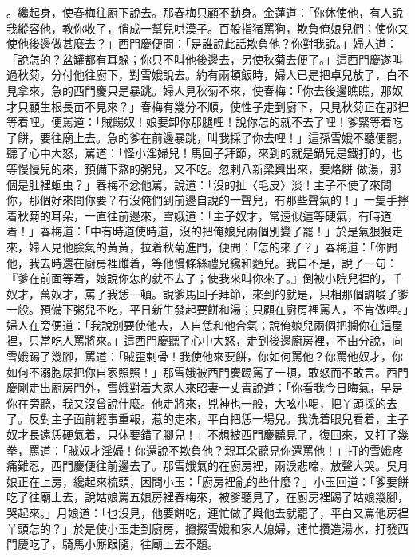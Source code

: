 \begin{showcontents}{}
。纔起身，使春梅往廚下說去。那春梅只顧不動身。金蓮道：「你休使他，有人說我縱容他，教你收了，俏成一幫兒哄漢子。百般指猪罵狗，欺負俺娘兒們；使你又使他後邊做甚麼去？」西門慶便問：「是誰說此話欺負他？你對我說。」婦人道：「說怎的？盆罐都有耳躲；你只不叫他後邊去，另使秋菊去便了。」這西門慶遂叫過秋菊，分付他往廚下，對雪娥說去。約有兩頓飯時，婦人已是把卓兒放了，白不見拿來，急的西門慶只是暴跳。婦人見秋菊不來，使春梅：「你去後邊瞧瞧，那奴才只顧生根長苗不見來？」春梅有幾分不順，使性子走到廚下，只見秋菊正在那裡等着哩。便罵道：「賊餳奴！娘要卸你那腿哩！說你怎的就不去了哩！爹緊等着吃了餅，要往廟上去。急的爹在前邊暴跳，叫我採了你去哩！」這孫雪娥不聽便罷，聽了心中大怒，罵道：「怪小淫婦兒！馬回子拜節，來到的就是鍋兒是鐵打的，也等慢慢兒的來，預備下熬的粥兒，又不吃。忽剌八新梁興出來，要烙餅 做湯，那個是肚裡蛔虫？」春梅不忿他罵，說道：「沒的扯〈毛皮〉淡！主子不使了來問你，那個好來問你要？有沒俺們到前邊自說的一聲兒，有那些聲氣的！」一隻手擰着秋菊的耳朵，一直往前邊來，雪娥道：「主子奴才，常遠似這等硬氣，有時道着！」春梅道：「中有時道使時道，沒的把俺娘兒兩個別變了罷！」於是氣狠狠走來，婦人見他臉氣的黃黃，拉着秋菊進門，便問：「怎的來了？」春梅道：「你問他，我去時還在廚房裡雌着，等他慢條絲禮兒纔和麪兒。我自不是，說了一句：『爹在前面等着，娘說你怎的就不去了；使我來叫你來了。』倒被小院兒裡的，千奴才，萬奴才，罵了我恁一頓。說爹馬回子拜節，來到的就是，只相那個調唆了爹一般。預備下粥兒不吃，平日新生發起要餅和湯；只顧在廚房裡罵人，不肯做哩。」婦人在旁便道：「我說別要使他去，人自恁和他合氣；說俺娘兒兩個把攔你在這屋裡，只當吃人罵將來。」這西門慶聽了心中大怒，走到後邊廚房裡，不由分說，向雪娥踢了幾腳，罵道：「賊歪剌骨！我使他來要餅，你如何罵他？你罵他奴才，你如何不溺胞尿把你自家照照！」那雪娥被西門慶踢罵了一頓，敢怒而不敢言。西門慶剛走出廚房門外，雪娥對着大家人來昭妻一丈青說道：「你看我今日晦氣，早是你在旁聽，我又沒曾說什麼。他走將來，兇神也一般，大吆小喝，把丫頭採的去了。反對主子面前輕事重報，惹的走來，平白把恁一場兒。我洗着眼兒看着，主子奴才長遠恁硬氣着，只休要錯了腳兒！」不想被西門慶聽見了，復回來，又打了幾拳，罵道：「賊奴才淫婦！你還說不欺負他？親耳朵聽見你還罵他！」打的雪娥疼痛難忍，西門慶便往前邊去了。那雪娥氣的在廚房裡，兩淚悲啼，放聲大哭。吳月娘正在上房，纔起來梳頭，因問小玉：「廚房裡亂的些什麼？」小玉回道：「爹要餅吃了往廟上去，說姑娘罵五娘房裡春梅來，被爹聽見了，在廚房裡踢了姑娘幾腳，哭起來。」月娘道：「也沒見，他要餅吃，連忙做了與他去就罷了，平白又罵他房裡丫頭怎的？」於是使小玉走到廚房，攛掇雪娥和家人媳婦，連忙攢造湯水，打發西門慶吃了，騎馬小廝跟隨，往廟上去不題。


\end{showcontents}
